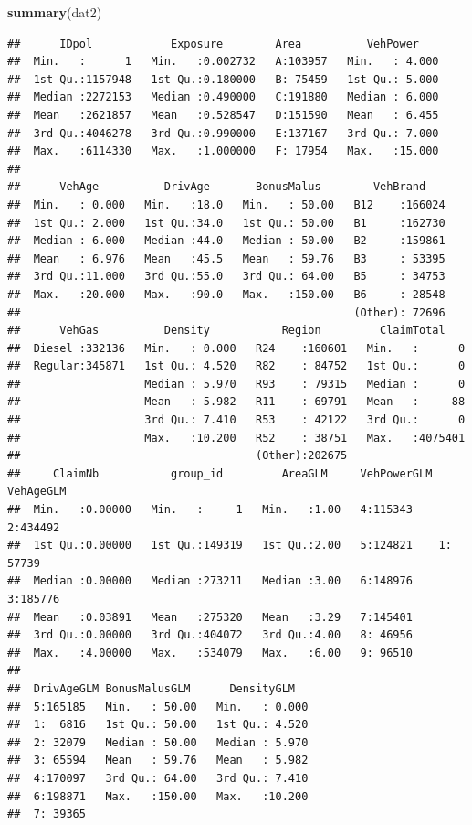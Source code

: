 \documentclass[
]{article}
\newenvironment{Shaded}{\begin{snugshade}}{\end{snugshade}}
\newcommand{\FunctionTok}[1]{\textcolor[rgb]{0.13,0.29,0.53}{\textbf{#1}}}
\newcommand{\NormalTok}[1]{#1}
\begin{document}
\begin{Shaded}
\begin{Highlighting}[]
\FunctionTok{summary}\NormalTok{(dat2)}
\end{Highlighting}
\end{Shaded}

\begin{verbatim}
##      IDpol            Exposure        Area          VehPower     
##  Min.   :      1   Min.   :0.002732   A:103957   Min.   : 4.000  
##  1st Qu.:1157948   1st Qu.:0.180000   B: 75459   1st Qu.: 5.000  
##  Median :2272153   Median :0.490000   C:191880   Median : 6.000  
##  Mean   :2621857   Mean   :0.528547   D:151590   Mean   : 6.455  
##  3rd Qu.:4046278   3rd Qu.:0.990000   E:137167   3rd Qu.: 7.000  
##  Max.   :6114330   Max.   :1.000000   F: 17954   Max.   :15.000  
##                                                                  
##      VehAge          DrivAge       BonusMalus        VehBrand     
##  Min.   : 0.000   Min.   :18.0   Min.   : 50.00   B12    :166024  
##  1st Qu.: 2.000   1st Qu.:34.0   1st Qu.: 50.00   B1     :162730  
##  Median : 6.000   Median :44.0   Median : 50.00   B2     :159861  
##  Mean   : 6.976   Mean   :45.5   Mean   : 59.76   B3     : 53395  
##  3rd Qu.:11.000   3rd Qu.:55.0   3rd Qu.: 64.00   B5     : 34753  
##  Max.   :20.000   Max.   :90.0   Max.   :150.00   B6     : 28548  
##                                                   (Other): 72696  
##      VehGas          Density           Region         ClaimTotal     
##  Diesel :332136   Min.   : 0.000   R24    :160601   Min.   :      0  
##  Regular:345871   1st Qu.: 4.520   R82    : 84752   1st Qu.:      0  
##                   Median : 5.970   R93    : 79315   Median :      0  
##                   Mean   : 5.982   R11    : 69791   Mean   :     88  
##                   3rd Qu.: 7.410   R53    : 42122   3rd Qu.:      0  
##                   Max.   :10.200   R52    : 38751   Max.   :4075401  
##                                    (Other):202675                    
##     ClaimNb           group_id         AreaGLM     VehPowerGLM VehAgeGLM 
##  Min.   :0.00000   Min.   :     1   Min.   :1.00   4:115343    2:434492  
##  1st Qu.:0.00000   1st Qu.:149319   1st Qu.:2.00   5:124821    1: 57739  
##  Median :0.00000   Median :273211   Median :3.00   6:148976    3:185776  
##  Mean   :0.03891   Mean   :275320   Mean   :3.29   7:145401              
##  3rd Qu.:0.00000   3rd Qu.:404072   3rd Qu.:4.00   8: 46956              
##  Max.   :4.00000   Max.   :534079   Max.   :6.00   9: 96510              
##                                                                          
##  DrivAgeGLM BonusMalusGLM      DensityGLM    
##  5:165185   Min.   : 50.00   Min.   : 0.000  
##  1:  6816   1st Qu.: 50.00   1st Qu.: 4.520  
##  2: 32079   Median : 50.00   Median : 5.970  
##  3: 65594   Mean   : 59.76   Mean   : 5.982  
##  4:170097   3rd Qu.: 64.00   3rd Qu.: 7.410  
##  6:198871   Max.   :150.00   Max.   :10.200  
##  7: 39365
\end{verbatim}
\end{document}
